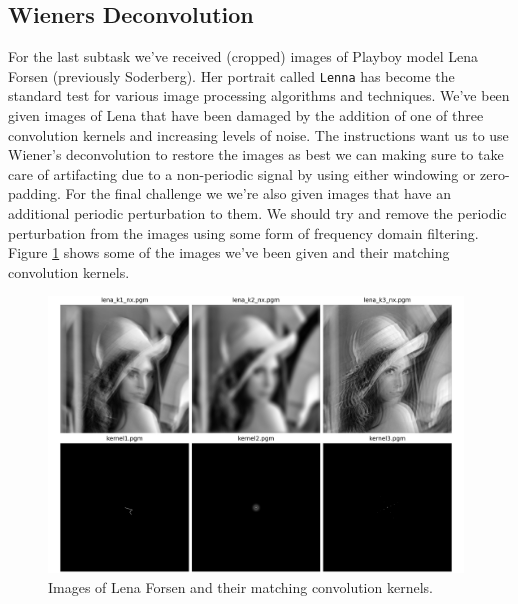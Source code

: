 \documentclass[10pt, titlepage, a4paper]{article}
\begin{document}
\subsection{Wieners Deconvolution}
For the last subtask we've received (cropped) images of Playboy model Lena Forsen (previously Soderberg). Her portrait called \texttt{Lenna} has become 
the standard test for various image processing algorithms and techniques. We've been given images of Lena that have been damaged by the addition of one of 
three convolution kernels and increasing levels of noise. The instructions want us to use Wiener's deconvolution to restore the images as best we can making sure 
to take care of artifacting due to a non-periodic signal by using either windowing or zero-padding. For the final challenge we we're also given images that 
have an additional periodic perturbation to them. We should try and remove the periodic perturbation from the images using some form of 
frequency domain filtering. Figure \ref{fig:lena} shows some of the images we've been given and their matching convolution kernels.

\begin{figure}[H]
    \centering
    \includegraphics[width=0.98\textwidth]{../ImageDeconvolution/Images/lena_and_kernels.png}
    \caption{Images of Lena Forsen and their matching convolution kernels.}
    \label{fig:lena}
\end{figure}
\end{document}
